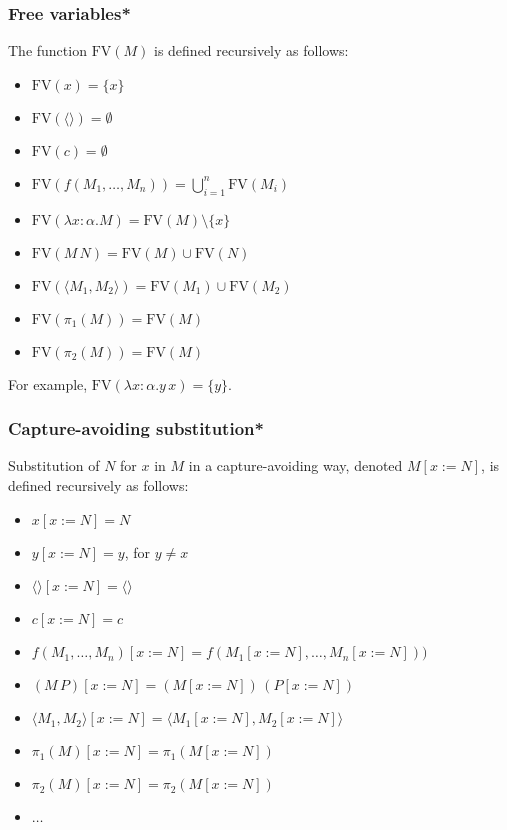 \documentclass[aspectratio=169]{beamer}
\begin{document}
\begin{frame}
\frametitle{Free variables*}
The function $\text{FV}(M)$ is defined recursively as follows:
\begin{itemize}
    \item $\text{FV}(x) = \{x\}$
    \item $\text{FV}(\langle \rangle) = \emptyset$
    \item $\text{FV}(c) = \emptyset$
    \item $\text{FV}(f(M_1, \ldots, M_n)) = \bigcup_{i=1}^{n} \text{FV}(M_i)$
    \pause
    \item $\text{FV}(\lambda x: \alpha. M) = \text{FV}(M) \setminus \{x\}$
    \pause
    \item $\text{FV}(M \, N) = \text{FV}(M) \cup \text{FV}(N)$
    \item $\text{FV}(\langle M_1, M_2 \rangle) = \text{FV}(M_1) \cup \text{FV}(M_2)$
    \item $\text{FV}(\pi_1(M)) = \text{FV}(M)$
    \item $\text{FV}(\pi_2(M)) = \text{FV}(M)$
\end{itemize}

\pause
For example, $\text{FV}(\lambda x: \alpha. y \, x) = \{y\}$.

\end{frame}

\begin{frame}
\frametitle{Capture-avoiding substitution*}

Substitution of $N$ for $x$ in $M$ in a capture-avoiding way, denoted $M[x := N]$, is defined recursively as follows:

\begin{itemize}
    \item $x[x := N] = N$
    \item $y[x := N] = y$, for $y \neq x$
    \pause
    \item $\langle \rangle[x := N] = \langle \rangle$
    \item $c[x := N] = c$
    \pause
    \item $f(M_1, \ldots, M_n)[x := N] = f(M_1[x := N], \ldots, M_n[x := N]))$
    \item $(M \, P)[x := N] = (M[x := N]) \, (P[x := N])$
    \item $\langle M_1 , M_2 \rangle[x := N] = \langle M_1[x := N], M_2[x := N] \rangle$
    \item $\pi_1(M)[x := N] = \pi_1(M[x := N])$
    \item $\pi_2(M)[x := N] = \pi_2(M[x := N])$
    \item $\ldots$
\end{itemize}
\end{frame}
\end{document}
